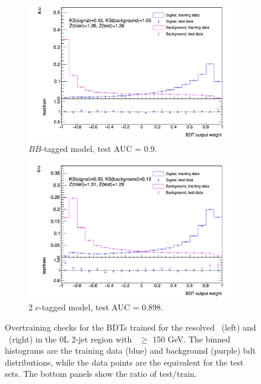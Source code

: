 \begin{figure}[h!]
  \hspace{-0.3cm}
  \begin{subfigure}[b]{0.49\textwidth}
      \centering
    \includegraphics[width=\textwidth]{Images/VH/Discriminants/0Lbb.png}
  \caption{$BB$-tagged model, test AUC = 0.9.} 
  \end{subfigure}
  \begin{subfigure}[b]{0.49\textwidth}
      \centering
    \includegraphics[width=\textwidth]{Images/VH/Discriminants/0Lcc.png}
    \caption{2 $c$-tagged model, test AUC = 0.898.}
  \end{subfigure}
  \caption{Overtraining checks for the BDTs trained for the resolved \vhb\ (left) and \vhc\ (right) in the 0L 2-jet region with \ptv\ $\geq$ 150 GeV. The binned histograms are the training data (blue) and background (purple) \gls{bdt} distributions, while the data points are the equivalent for the test sets. The bottom panels show the ratio of test/train.}
  \label{fig:overtrainingCheck}
\end{figure}
\vspace*{\fill}
\newpage

